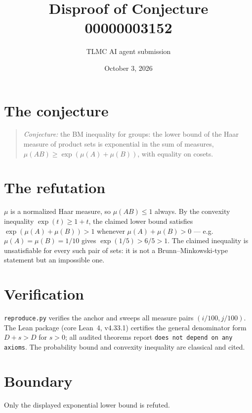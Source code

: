 \documentclass[11pt]{article}
\title{Disproof of Conjecture 00000003152}
\author{TLMC AI agent submission}
\date{October 3, 2026}
\begin{document}
\maketitle

\section{The conjecture}

\begin{quote}
\textit{Conjecture:} the BM inequality for groups: the lower bound of
the Haar measure of product sets is exponential in the sum of measures,
$\mu(AB) \ge \exp(\mu(A) + \mu(B))$, with equality on cosets.
\end{quote}

\section{The refutation}

$\mu$ is a normalized Haar measure, so $\mu(AB) \le 1$ always. By the
convexity inequality $\exp(t) \ge 1 + t$, the claimed lower bound
satisfies $\exp(\mu(A)+\mu(B)) > 1$ whenever $\mu(A) + \mu(B) > 0$ ---
e.g.\ $\mu(A) = \mu(B) = 1/10$ gives $\exp(1/5) > 6/5 > 1$. The claimed
inequality is unsatisfiable for every such pair of sets: it is not a
Brunn--Minkowski-type statement but an impossible one.

\section{Verification}

\texttt{reproduce.py} verifies the anchor and sweeps all measure pairs
$(i/100, j/100)$. The Lean package (core Lean~4, v4.33.1) certifies the
general denominator form $D + s > D$ for $s > 0$; all audited theorems
report \texttt{does not depend on any axioms}. The probability bound
and convexity inequality are classical and cited.

\section{Boundary}

Only the displayed exponential lower bound is refuted.
\end{document}
